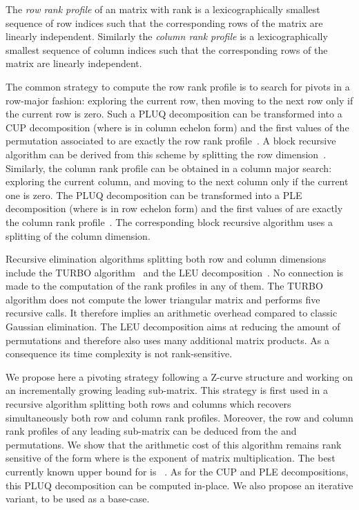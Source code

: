 \documentclass{article}
\begin{document}
The {\em row rank profile} of an  matrix with rank  is a
lexicographically smallest sequence of  row indices such that the
corresponding rows of the matrix are linearly independent. 
Similarly the {\em column rank profile} is a lexicographically smallest sequence
of  column indices such that the corresponding rows of the matrix are
linearly independent.

The common strategy to compute the row rank profile is to search for pivots in
a row-major fashion: exploring the current row, then moving to the next row only
if the current row is zero. Such a PLUQ decomposition can be transformed into a
CUP decomposition (where  is in column echelon form) and the first
 values of the permutation associated to  are exactly the row rank
profile~\cite{JPS:2011}. A block recursive algorithm can be derived from this scheme by
splitting the row dimension~\cite{Ibarra:1982:LSP}.
Similarly, the column rank profile can be obtained in a column major search:
exploring the current column, and moving to the next column only if the
current one is zero. The PLUQ decomposition can be transformed into a PLE
decomposition (where  is in row echelon form) and the first  values of
 are exactly the column rank profile~\cite{JPS:2011}. The corresponding block
recursive algorithm uses a splitting of the column dimension.


Recursive elimination algorithms splitting both row and column dimensions
include the TURBO algorithm~\cite{jgd:2002:PComp} and the LEU
decomposition~\cite{Malaschonok:2010}. 
No connection is made to the computation of the rank profiles in any of them.
The TURBO algorithm does not compute the lower triangular matrix  and
performs five recursive calls. It therefore implies an arithmetic overhead
compared to classic Gaussian elimination.
The LEU decomposition aims at reducing the amount of permutations and therefore also
uses many additional matrix products. As a consequence its time complexity
is not rank-sensitive.



We propose here a pivoting strategy following a Z-curve structure and
working on an incrementally growing leading sub-matrix. 
This strategy is first used in a recursive algorithm splitting both rows
and columns which recovers simultaneously both row and column rank profiles.
Moreover, the row and column rank profiles of any
leading sub-matrix can be deduced from the  and  permutations.
We show that the arithmetic cost of this algorithm remains rank sensitive of the
form  where  is the exponent of matrix
multiplication. The best currently known upper bound for  is
~\cite{Williams:2012:matmul}.
As for the CUP and PLE decompositions, this PLUQ decomposition can be computed
in-place. We also propose an iterative variant, to be used as a base-case.  
 
\end{document}
